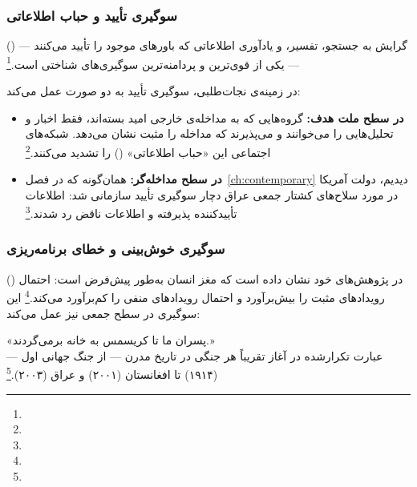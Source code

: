 \subsubsection{سوگیری تأیید و حباب اطلاعاتی}
\label{subsubsec:ch11-confirmation}

 () — گرایش به جستجو، تفسیر، و یادآوری اطلاعاتی که باورهای موجود را تأیید می‌کنند — یکی از قوی‌ترین و پردامنه‌ترین سوگیری‌های شناختی است.\footnote{}

در زمینه‌ی نجات‌طلبی، سوگیری تأیید به دو صورت عمل می‌کند:

\begin{itemize}
\item \textbf{در سطح ملت هدف:} گروه‌هایی که به مداخله‌ی خارجی امید بسته‌اند، فقط اخبار و تحلیل‌هایی را می‌خوانند و می‌پذیرند که مداخله را مثبت نشان می‌دهد. شبکه‌های اجتماعی این «حباب اطلاعاتی» () را تشدید می‌کنند.\footnote{}

\item \textbf{در سطح مداخله‌گر:} همان‌گونه که در فصل~\ref{ch:contemporary} دیدیم، دولت آمریکا در مورد سلاح‌های کشتار جمعی عراق دچار سوگیری تأیید سازمانی شد: اطلاعات تأییدکننده پذیرفته و اطلاعات ناقض رد شدند.\footnote{}
\end{itemize}

\subsubsection{سوگیری خوش‌بینی و خطای برنامه‌ریزی}
\label{subsubsec:ch11-optimism}

 () در پژوهش‌های خود نشان داده است که مغز انسان به‌طور پیش‌فرض  است: احتمال رویدادهای مثبت را بیش‌برآورد و احتمال رویدادهای منفی را کم‌برآورد می‌کند.\footnote{} این سوگیری در سطح جمعی نیز عمل می‌کند:

\begin{tcolorbox}[quotebox, title={نقل‌قول تاریخی}]
«پسران ما تا کریسمس به خانه برمی‌گردند.»\\
— عبارت تکرارشده در آغاز تقریباً هر جنگی در تاریخ مدرن — از جنگ جهانی اول (۱۹۱۴) تا افغانستان (۲۰۰۱) و عراق (۲۰۰۳).\footnote{}
\end{tcolorbox}

